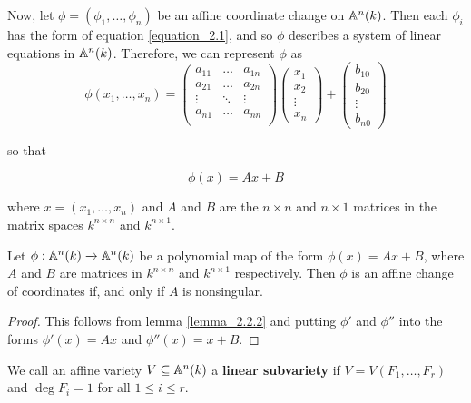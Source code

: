 Now, let $\phi=(\phi_1, \dots, \phi_n)$ be an affine coordinate change on
$\mathbb{A}^n(k)$. Then each $\phi_i$ has the form of equation \ref{equation_2.1}, and
so $\phi$ describes a system of linear equations in  $\mathbb{A}^n(k)$. Therefore, we
can represent $\phi$ as
\begin{equation}\label{equation_2.2}
  \phi(x_1, \dots, x_n)=
  \begin{pmatrix}
    a_{11}  & \dots   & a_{1n} \\
    a_{21}  & \dots   & a_{2n} \\
    \vdots  & \ddots  & \vdots  \\
    a_{n1}  & \dots   & a_{nn} \\
  \end{pmatrix}
  \begin{pmatrix}
    x_1 \\
    x_2 \\
    \vdots  \\
    x_n
  \end{pmatrix}+
  \begin{pmatrix}
    b_{10}  \\
    b_{20}  \\
    \vdots  \\
    b_{n0}
  \end{pmatrix}
\end{equation}

so that

\begin{equation*}
  \phi(x)=Ax+B
\end{equation*}

where $x=(x_1, \dots, x_n)$ and $A$ and $B$ are the $n \times n$ and $n \times
1$ matrices in the matrix spaces $k^{n \times n}$ and $k^{n \times 1}$.

\begin{lemma}\label{lemma_2.2.4}
  Let $\phi:\mathbb{A}^n(k) \xrightarrow{} \mathbb{A}^n(k)$ be a polynomial map of the form
  $\phi(x)=Ax+B$, where $A$ and $B$ are matrices in $k^{n \times n}$ and $k^{n
  \times 1}$ respectively. Then $\phi$ is an affine change of coordinates if,
  and only if $A$ is nonsingular.
\end{lemma}
\begin{proof}
  This follows from lemma \ref{lemma_2.2.2} and putting $\phi'$ and $\phi''$
  into the forms $\phi'(x)=Ax$ and  $\phi''(x)=x+B$.
\end{proof}

\begin{definition}
  We call an affine variety $V \subseteq \mathbb{A}^n(k)$ a \textbf{linear subvariety}
  if $V=V(F_1, \dots, F_r)$ and $\deg{F_i}=1$ for all $1 \leq i \leq r$.
\end{definition}

